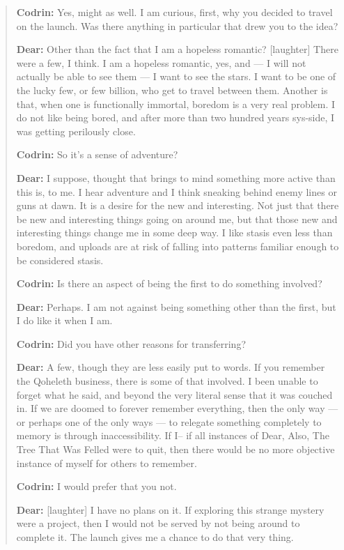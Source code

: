 \begin{quote}
\textbf{Codrin:} Yes, might as well. I am curious, first, why you decided to travel on the launch. Was there anything in particular that drew you to the idea?

\textbf{Dear:} Other than the fact that I am a hopeless romantic? {[}laughter{]} There were a few, I think. I am a hopeless romantic, yes, and — I will not actually be able to see them — I want to see the stars. I want to be one of the lucky few, or few billion, who get to travel between them. Another is that, when one is functionally immortal, boredom is a very real problem. I do not like being bored, and after more than two hundred years sys-side, I was getting perilously close.

\textbf{Codrin:} So it's a sense of adventure?

\textbf{Dear:} I suppose, thought that brings to mind something more active than this is, to me. I hear adventure and I think sneaking behind enemy lines or guns at dawn. It is a desire for the new and interesting. Not just that there be new and interesting things going on around me, but that those new and interesting things change me in some deep way. I like stasis even less than boredom, and uploads are at risk of falling into patterns familiar enough to be considered stasis.

\textbf{Codrin:} Is there an aspect of being the first to do something involved?

\textbf{Dear:} Perhaps. I am not against being something other than the first, but I do like it when I am.

\textbf{Codrin:} Did you have other reasons for transferring?

\textbf{Dear:} A few, though they are less easily put to words. If you remember the Qoheleth business, there is some of that involved. I been unable to forget what he said, and beyond the very literal sense that it was couched in. If we are doomed to forever remember everything, then the only way — or perhaps one of the only ways — to relegate something completely to memory is through inaccessibility. If I-- if all instances of Dear, Also, The Tree That Was Felled were to quit, then there would be no more objective instance of myself for others to remember.

\textbf{Codrin:} I would prefer that you not.

\textbf{Dear:} {[}laughter{]} I have no plans on it. If exploring this strange mystery were a project, then I would not be served by not being around to complete it. The launch gives me a chance to do that very thing.


\end{quote}

